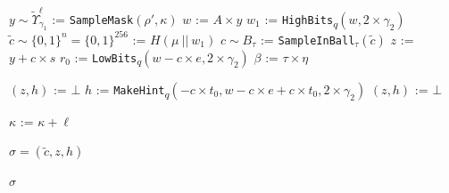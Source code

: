 \documentclass[runningheads]{llncs}
\numberwithin{equation}{section}
\begin{document}
\begin{algorithm}
\begin{algorithmic}[1]
            \vspace{1ex}

                \State $y \sim { \tilde{\Upsilon} }_{ { \gamma }_{1} }^{\ell}$ := \texttt{SampleMask}$( \rho', \kappa )$
                \State $w$ := $A \times y$
                \State ${w}_{1}$ := \texttt{HighBits}\textsubscript{$q$}$( w, 2 \times {\gamma}_{2} )$
                \State $\tilde{c} \sim { \{ 0 , 1 \} }^{n} = { \{ 0 , 1 \} }^{256}$ := $H\left( \mu\ ||\ {w}_{1} \right)$
                \State $c \sim {B}_{\tau}$ := \texttt{SampleInBall}${}_{\tau}$$(\tilde{c})$
                \State $z$ := $y + c \times s$
                \State ${r}_{0}$ := \texttt{LowBits}\textsubscript{$q$}$( w - c \times e, 2 \times {\gamma}_{2} )$
                \State $\beta$ := $\tau \times \eta$
                
                \vspace{1ex}

                    \State $(z, h)$ := $\bot$ 
                \Else
                    \State $h$ := \texttt{MakeHint}\textsubscript{$q$}$( -c \times {t}_{0}, w - c \times e + c \times {t}_{0}, 2 \times {\gamma}_{2} )$
                        \State $(z, h)$ := $\bot$ 
                    \EndIf
                \EndIf

                \vspace{1ex}

                \State $\kappa$ := $\kappa + \ell$

                \vspace{1ex}
                
            \EndWhile
            
            \vspace{1ex}
            
            \State $\sigma = \left( \tilde{c}, z, h \right)$
            
            \vspace{1ex}
            
            \State \Return $\sigma$
        \end{algorithmic}
   
    \end{algorithm}
    
\end{document}
